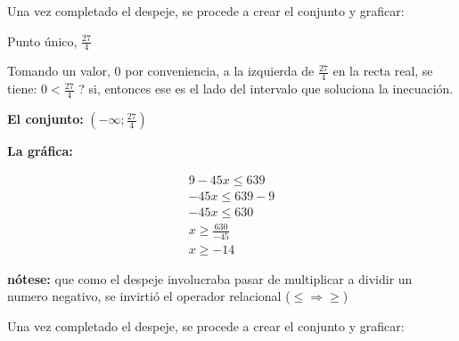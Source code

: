     Una vez completado el despeje, se procede a crear el conjunto y graficar:

    Punto único, $\displaystyle\frac{27}{4}$

    Tomando un valor, 0 por conveniencia, a la izquierda de $\displaystyle\frac{27}{4}$
    en la recta real,
    se tiene: $\displaystyle0<\frac{27}{4}$ ? si, entonces ese es el lado del intervalo que
    soluciona la inecuación.


    \textbf{El conjunto:} $\displaystyle\left(-\infty; \frac{27}{4}\right)$

    \textbf{La gráfica:}

    \vspace*{1cm}


    \begin{align*}
        9-45x \leq 639 		\\
        -45x \leq 639-9 \\
        -45x \leq 630 \\
        x \geq \frac{630}{-45} \\
        x \geq -14
    \end{align*}

    \textbf{nótese:} que como el despeje involucraba pasar de multiplicar a
    dividir un numero negativo, se invirtió el operador relacional ($\leq \Rightarrow \geq$)

    Una vez completado el despeje, se procede a crear el conjunto y graficar:

